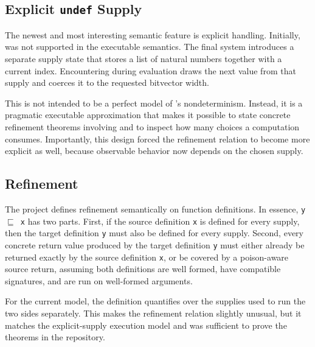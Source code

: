 \subsection{Explicit \texttt{undef} Supply}

The newest and most interesting semantic feature is explicit \vundef
handling. Initially, \vundef was not supported in the executable semantics.
The final system introduces a separate supply state that stores a list of
natural numbers together with a current index. Encountering \vundef during
evaluation draws the next value from that supply and coerces it to the
requested bitvector width.

This is not intended to be a perfect model of \llvm's nondeterminism.
Instead, it is a pragmatic executable approximation that makes it possible to
state concrete refinement theorems involving \vundef and to inspect how many
\vundef choices a computation consumes. Importantly, this design forced the
refinement relation to become more explicit as well, because observable
behavior now depends on the chosen \vundef supply.

\subsection{Refinement}

The project defines refinement semantically on function definitions. In
essence, \texttt{y~$\sqsubseteq$~x} has two parts. First, if the source
definition \texttt{x} is defined for every \vundef supply, then the target
definition \texttt{y} must also be defined for every \vundef supply. Second,
every concrete return value produced by the target definition \texttt{y} must
either already be returned exactly by the source definition \texttt{x}, or be
covered by a poison-aware source return, assuming both definitions are well
formed, have compatible signatures, and are run on well-formed arguments.

For the current \vundef model, the definition quantifies over the \vundef
supplies used to run the two sides separately. This makes the refinement
relation slightly unusual, but it matches the explicit-supply execution model
and was sufficient to prove the theorems in the repository.

